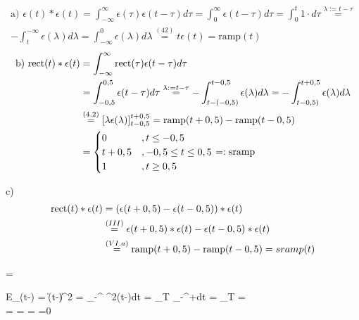 \begin{tbox}
	\begin{align*}\text{a) }\epsilon(t) * \epsilon(t) = \int_{-\infty}^{\infty}\epsilon(\tau)\epsilon(t  - \tau) d \tau = 
	\int_{0}^{\infty}\epsilon(t  - \tau) d \tau = 	\int_{0}^{t}1 \cdot d\tau \overset{\lambda := t-\tau}{=}\\
	-\int_{t}^{-\infty}\epsilon(\lambda) d \lambda = 
	\int_{-\infty}^{0}\epsilon(\lambda) d \lambda \overset{(42)}{=} t\epsilon(t) = \text{ramp}(t)\end{align*}
	 \begin{align*}
	\text{b) }\text{rect}(t) * \epsilon(t) &= 	\int_{-\infty}^{\infty}\text{rect}(\tau)\epsilon(t  - \tau) d \tau \\&= 
	\int_{-0,5}^{0,5}\epsilon(t  - \tau) d \tau \overset{\lambda := t-\tau}{=}
	-\int_{t-(-0,5)}^{t-0,5}\epsilon(\lambda) d \lambda = 
	-\int_{t-0,5)}^{t+0,5}\epsilon(\lambda) d \lambda\\ &\overset{(4.2)}{=}[\lambda\epsilon(\lambda)]_{t-0,5}^{t+0,5}
	= \text{ramp}(t+0,5) - \text{ramp}(t-0,5)\\
	&= \begin{cases}
	0 &, t \leq -0,5\\
	t+0,5 &, -0,5 \leq t \leq 0,5\\
	1 &, t \geq 0,5
	\end{cases} =: \text{sramp}
	\end{align*}
\end{tbox}

\begin{tbox}
	c) \begin{align*}
	\text{rect}(t) * \epsilon(t) &= (\epsilon(t+0,5) - \epsilon(t-0,5)) * \epsilon(t)\\
	&\overset{(III)}{=}\epsilon(t +0,5) * \epsilon(t) - \epsilon(t-0,5) * \epsilon(t)\\
	&\overset{(VI.a)}{=} \text{ramp}(t + 0,5) - \text{ramp}( t - 0,5) = sramp(t)
	\end{align*}
\end{tbox}

\begin{abox}
	\cos\Phi = 
\end{abox}

\begin{abox}
	E_{\delta(t-\tau)} = \left\|\delta(t-\tau)\right\|^2 = \int_{-\infty}^{\infty} \delta^2(t-\tau)dt = \lim\limits_{T \to \infty} \int_{\tau -}^{\tau +}dt = \lim\limits_{T \to \infty}  = \infty\\
	\cos\Phi =  =  = =0
\end{abox}

